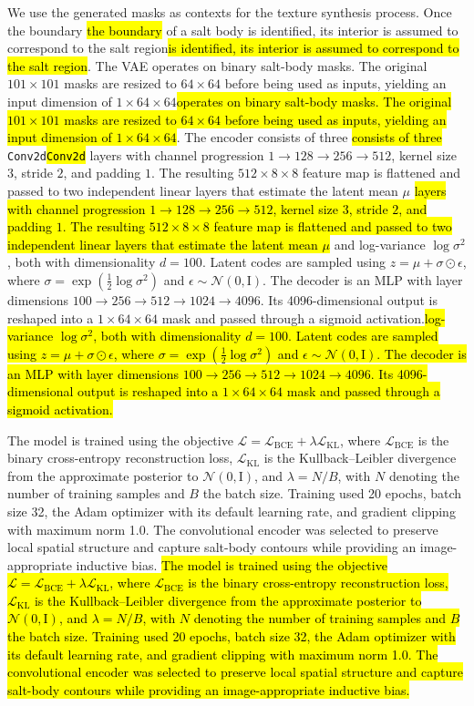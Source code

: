 \documentclass{ieeeaccess}
\makeatletter
\DeclareRobustCommand{\DIFaddbegin}{\DIFOaddbegin \let\includegraphics\DIFaddincludegraphics} %
\DeclareRobustCommand{\DIFaddend}{\DIFOaddend \let\includegraphics\DIFOincludegraphics} %
\DeclareRobustCommand{\DIFdelbegin}{\DIFOdelbegin \let\includegraphics\DIFdelincludegraphics} %
\DeclareRobustCommand{\DIFdelend}{\DIFOaddend \let\includegraphics\DIFOincludegraphics} %
\let\sout@orig\sout %
\renewcommand{\sout}[1]{\ifmmode\text{\sout@orig{\ensuremath{#1}}}\else\sout@orig{#1}\fi} %
\providecommand{\DIFadd}[1]{{\protect\color{blue}#1}}
\providecommand{\DIFdel}[1]{{\protect\color{red}\sout{#1}}}
\renewcommand{\DIFadd}[1]{\ifmmode#1\else\begingroup\let\protect\relax\hl{#1}\endgroup\fi}
\renewcommand{\DIFdel}[1]{}
\providecommand{\DIFaddbegin}{}
\providecommand{\DIFaddend}{}
\providecommand{\DIFdelbegin}{}
\providecommand{\DIFdelend}{}
\renewcommand{\DIFaddbegin}{}
\renewcommand{\DIFaddend}{}
\renewcommand{\DIFdelbegin}{}
\renewcommand{\DIFdelend}{}
\makeatother
\begin{document}
We use the generated masks as contexts for the texture synthesis process. Once \DIFdelbegin \DIFdel{we locate the boundaries }\DIFdelend \DIFaddbegin \DIFadd{the boundary }\DIFaddend of a salt body \DIFdelbegin \DIFdel{, we assume that its interior region is constituted by salt }\DIFdelend \DIFaddbegin \DIFadd{is identified, its interior is assumed to correspond to the salt region}\DIFaddend . The VAE \DIFdelbegin \DIFdel{model used in this work employs a simple feedforward network for the encoder and decoder}\DIFdelend \DIFaddbegin \DIFadd{operates on binary salt-body masks. The original $101 \times 101$ masks are resized to $64 \times 64$ before being used as inputs, yielding an input dimension of $1 \times 64 \times 64$}\DIFaddend . The encoder \DIFdelbegin \DIFdel{contains four stacked dense layers , }\DIFdelend \DIFaddbegin \DIFadd{consists of three }\texttt{\DIFadd{Conv2d}} \DIFadd{layers with channel progression $1 \rightarrow 128 \rightarrow 256 \rightarrow 512$, kernel size $3$, stride $2$, and padding $1$. The resulting $512 \times 8 \times 8$ feature map is flattened and passed to two independent linear layers that estimate the latent mean $\mu$ }\DIFaddend and \DIFdelbegin \DIFdel{the decoder contains five stacked dense layers. During inference, we sample the latent variables $z$ from the prior distribution $\pi(z)$, and then decode $z$ with the VAE's decoder to generate the salt masks with the inferred distribution. }\DIFdelend \DIFaddbegin \DIFadd{log-variance $\log\sigma^2$, both with dimensionality $d=100$. Latent codes are sampled using $z=\mu+\sigma\odot\epsilon$, where $\sigma=\exp(\frac{1}{2}\log\sigma^2)$ and $\epsilon\sim\mathcal{N}(0,\mathrm{I})$. The decoder is an MLP with layer dimensions $100\rightarrow256\rightarrow512\rightarrow1024\rightarrow4096$. Its 4096-dimensional output is reshaped into a $1\times64\times64$ mask and passed through a sigmoid activation.}\DIFaddend 

\DIFaddbegin \DIFadd{The model is trained using the objective $\mathcal{L}=\mathcal{L}_{\mathrm{BCE}}+\lambda\mathcal{L}_{\mathrm{KL}}$, where $\mathcal{L}_{\mathrm{BCE}}$ is the binary cross-entropy reconstruction loss, $\mathcal{L}_{\mathrm{KL}}$ is the Kullback--Leibler divergence from the approximate posterior to $\mathcal{N}(0,\mathrm{I})$, and $\lambda=N/B$, with $N$ denoting the number of training samples and $B$ the batch size. Training used 20 epochs, batch size 32, the Adam optimizer with its default learning rate, and gradient clipping with maximum norm 1.0. The convolutional encoder was selected to preserve local spatial structure and capture salt-body contours while providing an image-appropriate inductive bias.
}
\end{document}
